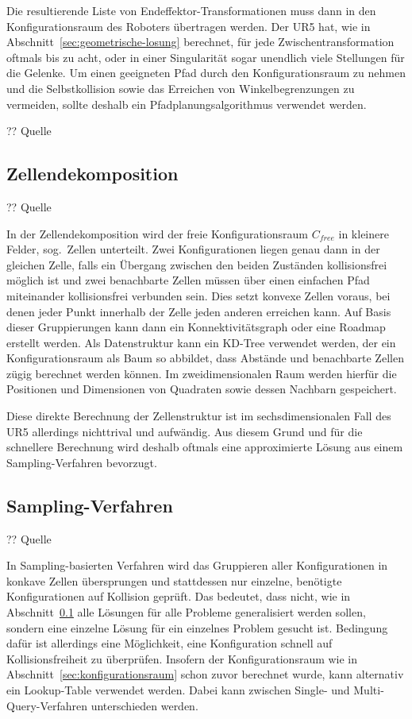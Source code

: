 Die resultierende Liste von Endeffektor-Transformationen muss dann in den Konfigurationsraum des Roboters übertragen werden.
Der UR5 hat, wie in Abschnitt~\ref{sec:geometrische-losung} berechnet, für jede Zwischentransformation oftmals bis zu acht, oder in einer Singularität sogar unendlich viele Stellungen für die Gelenke.
Um einen geeigneten Pfad durch den Konfigurationsraum zu nehmen und die Selbstkollision sowie das Erreichen von Winkelbegrenzungen zu vermeiden, sollte deshalb ein Pfadplanungsalgorithmus verwendet werden.

?? Quelle

\subsection{Zellendekomposition}\label{subsec:zellendekomposition}
?? Quelle

In der Zellendekomposition wird der freie Konfigurationsraum $C_{free}$ in kleinere Felder, sog.\ Zellen unterteilt.
Zwei Konfigurationen liegen genau dann in der gleichen Zelle, falls ein Übergang zwischen den beiden Zuständen kollisionsfrei möglich ist und zwei benachbarte Zellen müssen über einen einfachen Pfad miteinander kollisionsfrei verbunden sein.
Dies setzt konvexe Zellen voraus, bei denen jeder Punkt innerhalb der Zelle jeden anderen erreichen kann.
Auf Basis dieser Gruppierungen kann dann ein Konnektivitätsgraph oder eine Roadmap erstellt werden.
Als Datenstruktur kann ein KD-Tree verwendet werden, der ein Konfigurationsraum als Baum so abbildet, dass Abstände und benachbarte Zellen zügig berechnet werden können.
Im zweidimensionalen Raum werden hierfür die Positionen und Dimensionen von Quadraten sowie dessen Nachbarn gespeichert.

Diese direkte Berechnung der Zellenstruktur ist im sechsdimensionalen Fall des UR5 allerdings nichttrival und aufwändig.
Aus diesem Grund und für die schnellere Berechnung wird deshalb oftmals eine approximierte Lösung aus einem Sampling-Verfahren bevorzugt.

\subsection{Sampling-Verfahren}
?? Quelle

In Sampling-basierten Verfahren wird das Gruppieren aller Konfigurationen in konkave Zellen übersprungen und stattdessen nur einzelne, benötigte Konfigurationen auf Kollision geprüft.
Das bedeutet, dass nicht, wie in Abschnitt~\ref{subsec:zellendekomposition} alle Lösungen für alle Probleme generalisiert werden sollen, sondern eine einzelne Lösung für ein einzelnes Problem gesucht ist.
Bedingung dafür ist allerdings eine Möglichkeit, eine Konfiguration schnell auf Kollisionsfreiheit zu überprüfen.
Insofern der Konfigurationsraum wie in Abschnitt~\ref{sec:konfigurationsraum} schon zuvor berechnet wurde, kann alternativ ein Lookup-Table verwendet werden.
Dabei kann zwischen Single- und Multi-Query-Verfahren unterschieden werden.

